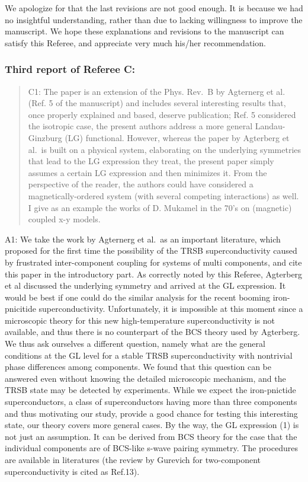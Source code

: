 \documentclass[11pt]{article}
\begin{document}
We apologize for that the last revisions are not good enough. It is
because we had no insightful understanding, rather than due to lacking
willingness to improve the manuscript. We hope these explanations and
revisions to the manuscript can satisfy this Referee, and appreciate
very much his/her recommendation.

\hypertarget{third-report-of-referee-c}{%
\subsubsection{Third report of Referee
C:}\label{third-report-of-referee-c}}

\begin{quote}
C1: The paper is an extension of the Phys. Rev.~B by Agternerg et al.
(Ref. 5 of the manuscript) and includes several interesting results
that, once properly explained and based, deserve publication; Ref. 5
considered the isotropic case, the present authors address a more
general Landau-Ginzburg (LG) functional. However, whereas the paper by
Agterberg et al.~is built on a physical system, elaborating on the
underlying symmetries that lead to the LG expression they treat, the
present paper simply assumes a certain LG expression and then minimizes
it. From the perspective of the reader, the authors could have
considered a magnetically-ordered system (with several competing
interactions) as well. I give as an example the works of D. Mukamel in
the 70's on (magnetic) coupled x-y models.
\end{quote}

A1: We take the work by Agternerg et al.~as an important literature,
which proposed for the first time the possibility of the TRSB
superconductivity caused by frustrated inter-component coupling for
systems of multi components, and cite this paper in the introductory
part. As correctly noted by this Referee, Agterberg et al discussed the
underlying symmetry and arrived at the GL expression. It would be best
if one could do the similar analysis for the recent booming
iron-pnicitide superconductivity. Unfortunately, it is impossible at
this moment since a microscopic theory for this new high-temperature
superconductivity is not available, and thus there is no counterpart of
the BCS theory used by Agterberg. We thus ask ourselves a different
question, namely what are the general conditions at the GL level for a
stable TRSB superconductivity with nontrivial phase differences among
components. We found that this question can be answered even without
knowing the detailed microscopic mechanism, and the TRSB state may be
detected by experiments. While we expect the iron-pnictide
superconductors, a class of superconductors having more than three
components and thus motivating our study, provide a good chance for
testing this interesting state, our theory covers more general cases. By
the way, the GL expression (1) is not just an assumption. It can be
derived from BCS theory for the case that the individual components are
of BCS-like s-wave pairing symmetry. The procedures are available in
literatures (the review by Gurevich for two-component superconductivity
is cited as Ref.13).
\end{document}
